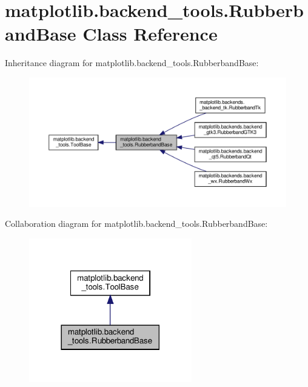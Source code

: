 \hypertarget{classmatplotlib_1_1backend__tools_1_1RubberbandBase}{}\section{matplotlib.\+backend\+\_\+tools.\+Rubberband\+Base Class Reference}
\label{classmatplotlib_1_1backend__tools_1_1RubberbandBase}


Inheritance diagram for matplotlib.\+backend\+\_\+tools.\+Rubberband\+Base\+:
\nopagebreak
\begin{figure}[H]
\begin{center}
\leavevmode
\includegraphics[width=350pt]{classmatplotlib_1_1backend__tools_1_1RubberbandBase__inherit__graph}
\end{center}
\end{figure}


Collaboration diagram for matplotlib.\+backend\+\_\+tools.\+Rubberband\+Base\+:
\nopagebreak
\begin{figure}[H]
\begin{center}
\leavevmode
\includegraphics[width=201pt]{classmatplotlib_1_1backend__tools_1_1RubberbandBase__coll__graph}
\end{center}
\end{figure}
